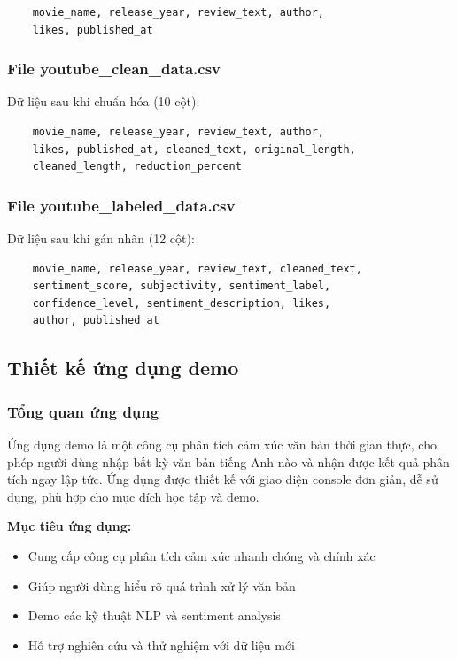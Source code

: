 \begin{verbatim}
    movie_name, release_year, review_text, author, 
    likes, published_at
\end{verbatim}

\subsubsection{File youtube\_clean\_data.csv}
Dữ liệu sau khi chuẩn hóa (10 cột):

\begin{verbatim}
    movie_name, release_year, review_text, author, 
    likes, published_at, cleaned_text, original_length, 
    cleaned_length, reduction_percent
\end{verbatim}

\subsubsection{File youtube\_labeled\_data.csv}
Dữ liệu sau khi gán nhãn (12 cột):

\begin{verbatim}
    movie_name, release_year, review_text, cleaned_text,
    sentiment_score, subjectivity, sentiment_label,
    confidence_level, sentiment_description, likes,
    author, published_at
\end{verbatim}

\subsection{Thiết kế ứng dụng demo}

\subsubsection{Tổng quan ứng dụng}
Ứng dụng demo là một công cụ phân tích cảm xúc văn bản thời gian thực, cho phép người dùng nhập bất kỳ văn bản tiếng Anh nào và nhận được kết quả phân tích ngay lập tức. Ứng dụng được thiết kế với giao diện console đơn giản, dễ sử dụng, phù hợp cho mục đích học tập và demo.

\textbf{Mục tiêu ứng dụng:}
\begin{itemize}
    \item Cung cấp công cụ phân tích cảm xúc nhanh chóng và chính xác
    \item Giúp người dùng hiểu rõ quá trình xử lý văn bản
    \item Demo các kỹ thuật NLP và sentiment analysis
    \item Hỗ trợ nghiên cứu và thử nghiệm với dữ liệu mới
\end{itemize}

